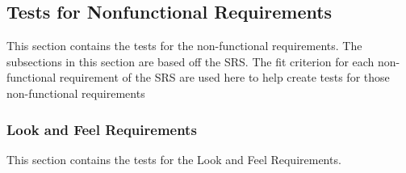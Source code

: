 \documentclass[12pt, titlepage]{article}
\begin{document}
\subsection{Tests for Nonfunctional Requirements}

This section contains the tests for the non-functional requirements. The subsections in this section are based off the SRS. The fit criterion for each non-functional requirement of the SRS are used here to help create tests for those non-functional requirements





\subsubsection{Look and Feel Requirements}

This section contains the tests for the Look and Feel Requirements.
		
\end{document}
